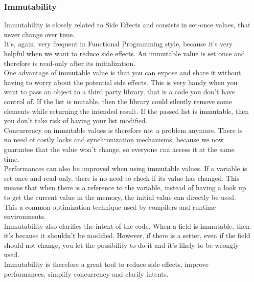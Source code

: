 \subsubsection{Immutability}
Immutability is closely related to Side Effects and consists in set-once
values, that never change over time. \\
It's, again, very frequent in Functional Programming style, because
it's very helpful when we want to reduce side effects.
An immutable value is set once and therefore is read-only after its
initialization. \\
\newline
One advantage of immutable value is that you can expose and share
it without having to worry about the potential side effects.
This is very handy when you want to pass an object to a third party
library, that is a code you don't have control of.
If the list is mutable, then the library could silently remove some
elements while returning the intended result.
If the passed list is immutable, then you don't take risk of having your
list modified. \\
\newline
Concurrency on immutable values is therefore not a problem anymore.
There is no need of costly locks and synchronization mechanisms, because
we now guarantee that the value won't change, so everyone can access it
at the same time. \\
\newline
Performances can also be improved when using immutable values.
If a variable is set once and read only, there is no need to check if
its value has changed.
This means that when there is a reference to the variable, instead of
having a look up to get the current value in the memory, the initial
value can directly be used.
This a common optimization technique used by compilers and runtime
environments. \\
\newline
Immutability also clarifies the intent of the code.
When a field is immutable, then it's because it shouldn't be modified.
However, if there is a setter, even if the field should not change,
you let the possibility to do it and it's likely to be wrongly used. \\
\newline
Immutability is therefore a great tool to reduce side effects, improve
performances, simplify concurrency and clarify intents.

